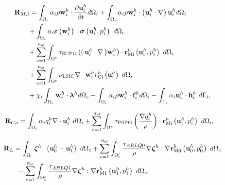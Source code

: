 \documentclass[tese_patricia]{subfiles}
\begin{document}
\begin{align}
	\begin{split}
		&\mathbf{R}_{M,i} = \int_{\domain_i} \arlequinWF_{i} \density \wArlqi \cdot \frac{\partial\uArlqi}{\partial t} d\domain_{i} +
		\int_{\domain_i} \arlequinWF_{i} \density \wArlqi \cdot  \left(\uArlqi \cdot \nabla\right)\uArlqi d\domain_{i}  \\ 
		&\qquad+	
		\int_{\domain_{i}} \arlequinWF_{i} \straintensor \left(\wArlqi\right) : \stresstensor \left(\uArlqi,\pArlqi\right)\ d\domain_{i} 
		\\ 
		&\qquad+ \sum_{e=1}^{\nel} \int_{\domainE} \SUPG  \left( \right(\uArlqi \cdot \nabla \left) \wArlqi\right) \cdot \resMomI \left(\uArlqi,\pArlqi \right)\  d\domain_{i} \\ 
		&\qquad+\sum_{e=1}^{\nel} \int_{\domainE} \LSIC \nabla \cdot \wArlqi \resPreI
		\left(\uArlqi\right)\  d\domain_{i} \\
		&\qquad+ \chi_{i} \int_{\domain_c} \wArlqi \cdot \lagrangeMultiplier^{h} d\domain_{c} - \int_{\domain_i} \arlequinWF_{i} \density \wArlqi \cdot  \sbodyforce_{i}^{h} d\domain_{i} - \int_{\boundary_{i}} \arlequinWF_{i} \uArlqi \cdot \straction_{i}^{h}\ d\boundary_{i},
		\label{eq:ResidualMomentum}
	\end{split}
\end{align}


\begin{align}
	\begin{split}
		&\mathbf{R}_{C,i} = \int_{\Omega_{i}} \alpha_{i} q_i^h \nabla \cdot \mathbf{u}_i^{h} \ d\Omega_{i} +
		\sum_{e=1}^{n_{\mathrm{el}}} \int_{\Omega^e} \tau_{\mathrm{PSPG}} \left(\frac{\nabla q_i^h }{\rho}\right) \cdot \mathbf{r}_{\mathrm{Mi}}^{h} \left(\mathbf{u}_i^{h},p_i^{h} \right) \  d\Omega_{i},
		\label{eq:ResidualContinum}
	\end{split}
\end{align}

\begin{align}
	\begin{split}
		&\mathbf{R}_{L} = \int_{\Omega_{c}}  \boldsymbol{\zeta}^h  \cdot \left(\mathbf{u}_0^h - \mathbf{u}_1^h \right) \ d\Omega_{c} + \sum_{e=1}^{n_{\mathrm{el}}} \int_{\Omega^e_{c}} \frac{\tau_{ARLQ0}}{\rho} \nabla \boldsymbol{\zeta}^h : \nabla \mathbf{r}_{\mathrm{M0}}^{h}\left(\mathbf{u}_0^h,p_0^h\right) \ d\Omega_{c}\\
		&\qquad - \sum_{e=1}^{n_{\mathrm{el}}} \int_{\Omega^e_{c}} \frac{\tau_{ARLQ1}}{\rho} \nabla \boldsymbol{\zeta}^h : \nabla \mathbf{r}_{\mathrm{M1}}^{h}\left(\mathbf{u}_1^h,p_1^h\right) \ d\Omega_{c}.
		\label{eq:ResidualLagrange}
	\end{split}
\end{align}
\end{document}
